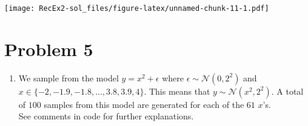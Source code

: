 \documentclass[
]{article}
\providecommand{\tightlist}{%
  \setlength{\itemsep}{0pt}\setlength{\parskip}{0pt}}
\begin{document}
\texttt{[image: RecEx2-sol\_files/figure-latex/unnamed-chunk-11-1.pdf]}

\section{Problem 5}\label{problem-5}

\begin{enumerate}
\def\labelenumi{\alph{enumi})}
\tightlist
\item
  We sample from the model \(y=x^2+\epsilon\) where
  \(\epsilon \sim \mathcal{N}(0,2^2)\) and
  \(x\in \{-2,-1.9,-1.8,...,3.8,3.9,4\}\). This means that
  \(y \sim \mathcal{N}(x^2,2^2)\). A total of \(100\) samples from this
  model are generated for each of the \(61\) \(x\)'s.\\
  See comments in code for further explanations.
\end{enumerate}
\end{document}
